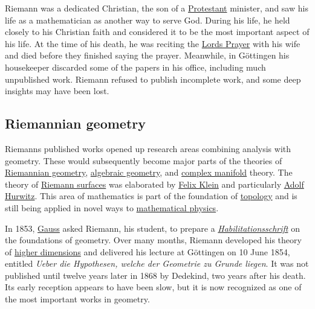 Riemann was a dedicated Christian, the son of a \href{https://en.wikipedia.org/wiki/Protestant}{Protestant} minister, and saw his life as a mathematician as another way to serve God. During his life, he held closely to his Christian faith and considered it to be the most important aspect of his life. At the time of his death, he was reciting the \href{https://en.wikipedia.org/wiki/Lord's_Prayer}{Lord\textquotesingle s Prayer} with his wife and died before they finished saying the prayer. Meanwhile, in Göttingen his housekeeper discarded some of the papers in his office, including much unpublished work. Riemann refused to publish incomplete work, and some deep insights may have been lost.


\subsection{Riemannian geometry}\label{Riemannian_geometry}

Riemann\textquotesingle s published works opened up research areas combining analysis with geometry. These would subsequently become major parts of the theories of \href{https://en.wikipedia.org/wiki/Riemannian_geometry}{Riemannian geometry}, \href{https://en.wikipedia.org/wiki/Algebraic_geometry}{algebraic geometry}, and \href{https://en.wikipedia.org/wiki/Complex_manifold}{complex manifold} theory. The theory of \href{https://en.wikipedia.org/wiki/Riemann_surface}{Riemann surfaces} was elaborated by \href{https://en.wikipedia.org/wiki/Felix_Klein}{Felix Klein} and particularly \href{https://en.wikipedia.org/wiki/Adolf_Hurwitz}{Adolf Hurwitz}. This area of mathematics is part of the foundation of \href{https://en.wikipedia.org/wiki/Topology}{topology} and is still being applied in novel ways to \href{https://en.wikipedia.org/wiki/Mathematical_physics}{mathematical physics}.

In 1853, \href{https://en.wikipedia.org/wiki/Carl_Friedrich_Gauss}{Gauss} asked Riemann, his student, to prepare a \emph{\href{https://en.wikipedia.org/wiki/Habilitationsschrift}{Habilitationsschrift}} on the foundations of geometry. Over many months, Riemann developed his theory of \href{https://en.wikipedia.org/wiki/Higher_dimensions}{higher dimensions} and delivered his lecture at Göttingen on 10 June 1854, entitled \emph{Ueber die Hypothesen, welche der Geometrie zu Grunde liegen}. It was not published until twelve years later in 1868 by Dedekind, two years after his death. Its early reception appears to have been slow, but it is now recognized as one of the most important works in geometry.

